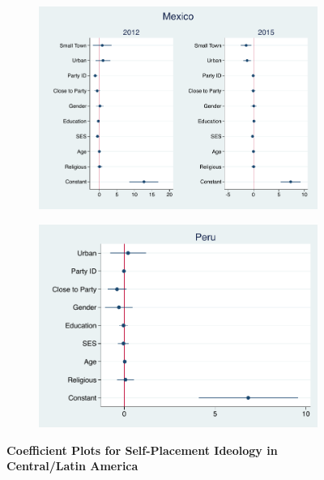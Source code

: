 \documentclass[12pt, titlepage]{article}
\newcommand\tb{\textbf}
\begin{document}
\begin{figure}[H]
	\centering
	\begin{subfigure}[b]{0.475\textwidth}
		\centering
		\includegraphics[width=\textwidth]{IdeologyCoef/Mexico}
	\end{subfigure}
	\hfill
	\begin{subfigure}[b]{0.475\textwidth}  
		\centering 
		\includegraphics[width=\textwidth]{IdeologyCoef/Peru}
	\end{subfigure}
	\caption[ \tb{Self-Placement Ideology - Central/Latin America} ]
	{\tb {Coefficient Plots for Self-Placement Ideology in Central/Latin America} }
	\label{America}
\end{figure}
\end{document}
